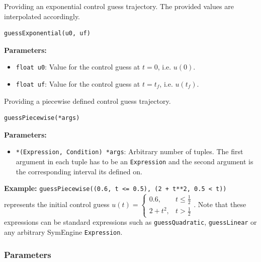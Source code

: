 \documentclass[12pt]{article}
\begin{document}
\begin{mdframed}[backgroundcolor=gray!10, roundcorner=10pt, linewidth=1pt]

	Providing an exponential control guess trajectory. The provided values
	are interpolated accordingly.

	\begin{lstlisting}
guessExponential(u0, uf)
	\end{lstlisting}

	\textbf{Parameters:}
	\begin{itemize}
		\item \texttt{float u0}: Value for the control guess at $t=0$,
		      i.e. $u(0)$.
		\item \texttt{float uf}: Value for the control guess at
		      $t=t_f$, i.e. $u(t_f)$.
	\end{itemize}

\end{mdframed}

\begin{mdframed}[backgroundcolor=gray!10, roundcorner=10pt, linewidth=1pt]

	Providing a piecewise defined control guess trajectory.

	\begin{lstlisting}
guessPiecewise(*args)
	\end{lstlisting}

	\textbf{Parameters:}
	\begin{itemize}
		\item \texttt{*(Expression, Condition) *args}: Arbitrary number
		      of tuples. The first argument in each tuple has to be an \texttt{Expression} and the second argument is the corresponding interval its defined on.
		      
	\end{itemize}

	\textbf{Example:} \texttt{guessPiecewise((0.6, t <= 0.5), (2 + t**2,
		0.5 < t))} represents the initial control guess $u(t) =
		\begin{cases}
			0.6,     & t \leq \frac{1}{2} \\
			2 + t^2, & t > \frac{1}{2}
		\end{cases}$. Note that these expressions can be standard
	expressions
	such as \texttt{guessQuadratic}, \texttt{guessLinear} or any arbitrary
	SymEngine \texttt{Expression}.
\end{mdframed}

\subsubsection{Parameters}
\end{document}
